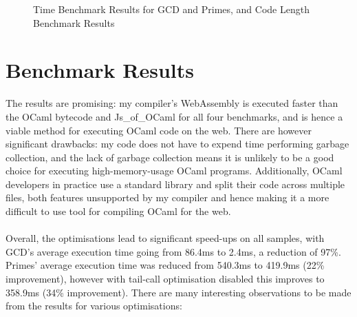 \begin{figure}[h]
	\caption{Time Benchmark Results for GCD and Primes, and Code Length Benchmark Results}
	\label{fig:timebenchfibquick}
\end{figure}

\section{Benchmark Results}
The results are promising: my compiler's WebAssembly is executed faster than the OCaml bytecode and Js\_of\_OCaml for all four benchmarks, and is hence a viable method for executing OCaml code on the web. There are however significant drawbacks: my code does not have to expend time performing garbage collection, and the lack of garbage collection means it is unlikely to be a good choice for executing high-memory-usage OCaml programs. Additionally, OCaml developers in practice use a standard library and split their code across multiple files, both features unsupported by my compiler and hence making it a more difficult to use tool for compiling OCaml for the web.
\\\\
Overall, the optimisations lead to significant speed-ups on all samples, with GCD's average execution time going from 86.4ms to 2.4ms, a reduction of 97\%. Primes' average execution time was reduced from 540.3ms to 419.9ms (22\% improvement), however with tail-call optimisation disabled this improves to 358.9ms (34\% improvement). There are many interesting observations to be made from the results for various optimisations:

